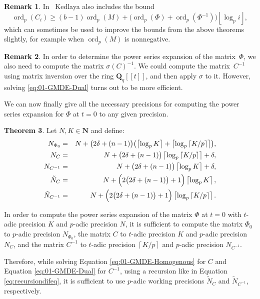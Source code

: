 \documentclass[a4paper,11pt]{article}
\numberwithin{equation}{section}
\providecommand{\floor}[1]{\left\lfloor#1\right\rfloor}   %
\providecommand{\ceil}[1]{\left\lceil#1\right\rceil}   %
\newcommand{\NN}{\mathbf{N}} %
\newcommand{\QQ}{\mathbf{Q}} %
\DeclareMathOperator{\ord}{ord}          %
\theoremstyle{definition}
\newtheorem{thm}{Theorem}[section]
\newtheorem{rem}[thm]{Remark}
\begin{document}
\begin{rem}
In~\citep[Remark~18.3.4]{Kedlaya2010} Kedlaya also includes the bound
\begin{equation*}
\ord_p(C_i) \geq (b - 1) \ord_p(M) 
            + \bigl( \ord_p(\Phi) + \ord_p(\Phi^{-1}) \bigr) \floor{\log_p i},
\end{equation*}
which can sometimes be used to improve the bounds from the above theorems 
slightly, for example when $\ord_p(M)$ is nonnegative.
\end{rem}

\begin{rem} \label{rem:sigmatrick}
In order to determine the power series expansion of the matrix~$\Phi$, 
we also need to compute the matrix $\sigma(C)^{-1}$. We could compute 
the matrix~$C^{-1}$ using matrix inversion over the ring $\mathbf{Q}_q[[t]]$,
and then apply $\sigma$ to it. However, solving \eqref{eq:01-GMDE-Dual} turns
out to be more efficient. 
\end{rem}

We can now finally give all the necessary precisions for computing the power 
series expansion for $\Phi$ at $t=0$ to any given precision.

\begin{thm} \label{thm:Ni}
Let $N,K \in \NN$ and define:
\begin{eqnarray*}
N_{\Phi_0}   		&=& N+\bigl(2\delta+(n-1)\bigr) \bigl(\ceil{\log_p K} + \ceil{\log_p \ceil{K/p}}\bigr),\\
N_{C}				&=& N+\bigl(2\delta+(n-1)\bigr) \ceil{\log_p \ceil{K/p}} + \delta, \\
N_{C^{-1}}			&=& N+\bigl(2\delta+(n-1)\bigr) \ceil{\log_p K} + \delta, \\
\tilde{N}_C			&=& N+\Bigl(2 \bigl(2 \delta + (n-1)\bigr) + 1\Bigr) \ceil{\log_p K}, \\
\tilde{N}_{C^{-1}}	&=& N+\Bigl(2 \bigl(2 \delta + (n-1)\bigr) + 1\Bigr) \ceil{\log_p \ceil{K/p}}.
\end{eqnarray*}

In order to compute the power series expansion 
of the matrix $\Phi$ at $t=0$ with $t$-adic precision $K$ and $p$-adic precision $N$, 
it is sufficient to compute
the matrix $\Phi_0$ to $p$-adic precision $N_{\Phi_0}$,
the matrix $C$ to $t$-adic precision $K$ and $p$-adic precision $N_{C}$, and
the matrix $C^{-1}$ to $t$-adic precision $\ceil{K/p}$ and $p$-adic precision 
$N_{C^{-1}}$.

Therefore, while solving Equation \eqref{eq:01-GMDE-Homogenous} for $C$ and 
Equation \eqref{eq:01-GMDE-Dual} for $C^{-1}$, using a recursion like in 
Equation \eqref{eq:recursiondifeq}, it is sufficient to use $p$-adic 
working precisions $\tilde{N}_C$ and $\tilde{N}_{C^{-1}}$, respectively.
\end{thm}
\end{document}
